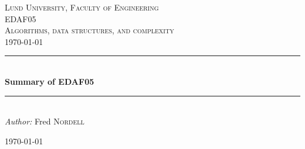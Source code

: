 \documentclass[12pt]{article} %
\begin{document}

\begin{titlepage}

\newcommand{\HRule}{\rule{\linewidth}{0.5mm}} %

\center %

\textsc{\LARGE Lund University, Faculty of Engineering}\\[1.5cm] %
\textsc{\Large EDAF05}\\[0.5cm] %
\textsc{\large Algorithms, data structures, and complexity}\\[0.5cm] %
{\large \today}\\[3cm] %

\HRule \\[1cm]
{ \huge \bfseries Summary of EDAF05}\\[0.4cm] %
\HRule \\[1.5cm]

\emph{Author:} Fred \textsc{Nordell} %

{\large \today}\\[3cm] %


\vfill %

\end{titlepage}


\tableofcontents %
\lstlistoflistings %
\listoffigures %

\newpage %
\end{document}
